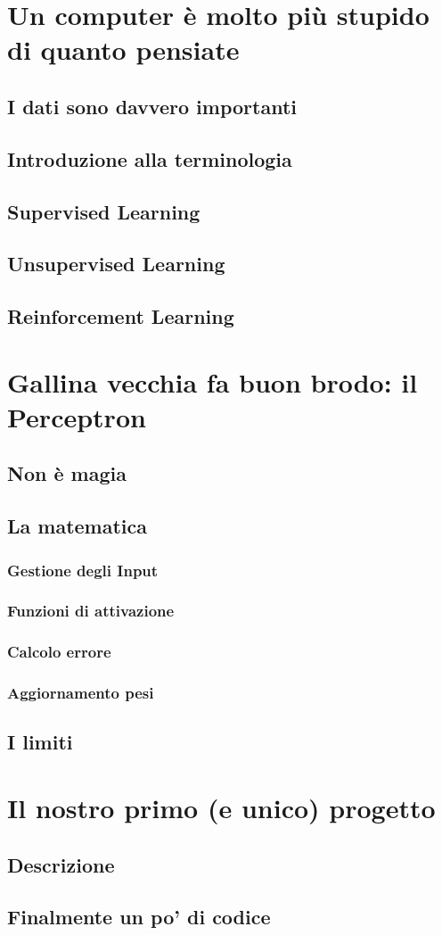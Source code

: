 \documentclass[12pt,a4paper]{report}
\begin{document}
\chapter{Un computer è molto più stupido di quanto pensiate}
\section{I dati sono davvero importanti}
\section{Introduzione alla terminologia}
\section{Supervised Learning}
\section{Unsupervised Learning}
\section{Reinforcement Learning}

\chapter{Gallina vecchia fa buon brodo: il Perceptron}
\section{Non è magia}
\section{La matematica}
\subsection{Gestione degli Input}
\subsection{Funzioni di attivazione}
\subsection{Calcolo errore}
\subsection{Aggiornamento pesi}
\section{I limiti}

\chapter{Il nostro primo (e unico) progetto}
\section{Descrizione}
\section{Finalmente un po' di codice}
\end{document}
